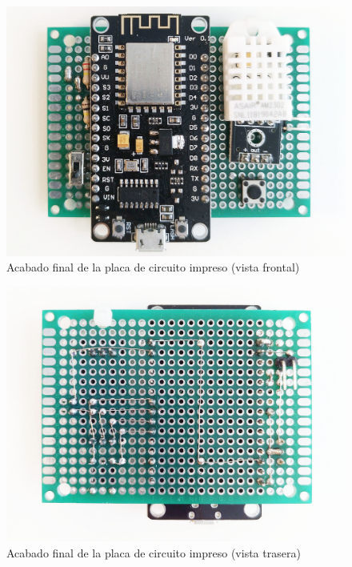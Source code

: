 \vfill

\begin{figure}[H]
  \centering
  \includegraphics[width=1\columnwidth]{../photos/exterior-pcb-front}
  \caption{Acabado final de la placa de circuito impreso (vista frontal)}
  \label{fig:exterior-pcb-front}
\end{figure}

\vfill

\clearpage

\begin{figure}
  \centering
  \includegraphics[width=1\columnwidth]{../photos/exterior-pcb-back}
  \caption{Acabado final de la placa de circuito impreso (vista trasera)}
  \label{fig:exterior-pcb-back}
\end{figure}

\clearpage


